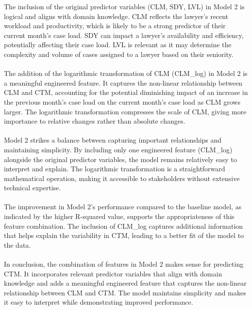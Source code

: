 \documentclass{article}
\begin{document}
\noindent The inclusion of the original predictor variables (CLM, SDY, LVL) in Model 2 is logical and aligns with domain knowledge. CLM reflects the lawyer's recent workload and productivity, which is likely to be a strong predictor of their current month's case load. SDY can impact a lawyer's availability and efficiency, potentially affecting their case load. LVL is relevant as it may determine the complexity and volume of cases assigned to a lawyer based on their seniority.
\\\\
The addition of the logarithmic transformation of CLM (CLM\_log) in Model 2 is a meaningful engineered feature. It captures the non-linear relationship between CLM and CTM, accounting for the potential diminishing impact of an increase in the previous month's case load on the current month's case load as CLM grows larger. The logarithmic transformation compresses the scale of CLM, giving more importance to relative changes rather than absolute changes.
\\\\
Model 2 strikes a balance between capturing important relationships and maintaining simplicity. By including only one engineered feature (CLM\_log) alongside the original predictor variables, the model remains relatively easy to interpret and explain. The logarithmic transformation is a straightforward mathematical operation, making it accessible to stakeholders without extensive technical expertise.
\\\\
The improvement in Model 2's performance compared to the baseline model, as indicated by the higher R-squared value, supports the appropriateness of this feature combination. The inclusion of CLM\_log captures additional information that helps explain the variability in CTM, leading to a better fit of the model to the data.
\\\\
In conclusion, the combination of features in Model 2 makes sense for predicting CTM. It incorporates relevant predictor variables that align with domain knowledge and adds a meaningful engineered feature that captures the non-linear relationship between CLM and CTM. The model maintains simplicity and makes it easy to interpret while demonstrating improved performance.
\end{document}
